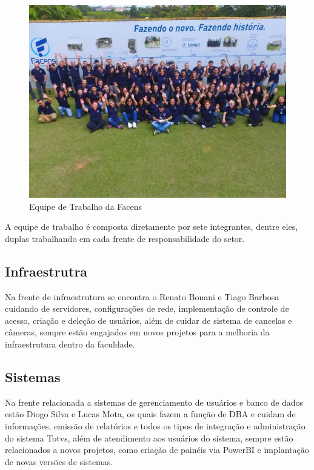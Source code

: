 \documentclass[
	12pt,				%
	oneside,			%
	a4paper,			%
	chapter=TITLE,		%
	section=TITLE,		%
	sumario=tradicional %
	english,			%
	french,				%
	spanish,			%
	brazil				%
	]{abntex2}
\begin{document}
\begin{figure}[htb]
	\caption{\label{fig:equipefacens} Equipe de Trabalho da Facens}
	\begin{center}
		\includegraphics[scale=0.6]{equipefacens}
	\end{center}
\end{figure}

\label{sec:equipetrabalho}
A equipe de trabalho é composta diretamente por sete integrantes, dentre eles, duplas trabalhando em cada frente de responsabilidade do setor.

\subsection{Infraestrutra}
Na frente de infraestrutura se encontra o Renato Bonani e Tiago Barbosa cuidando de servidores, configurações de rede, implementação de controle de acesso, criação e deleção de usuários, além de cuidar de sistema de cancelas e câmeras, sempre estão engajados em novos projetos para a melhoria da infraestrutura dentro da faculdade.

\subsection{Sistemas}
Na frente relacionada a sistemas de gerenciamento de usuários e banco de dados estão Diogo Silva e Lucas Mota, os quais fazem a função de DBA  e cuidam de informações, emissão de relatórios e todos os tipos de integração e administração do sistema Totvs, além de atendimento aos usuários do sistema, sempre estão relacionados a novos projetos, como criação de painéis via PowerBI e implantação de novas versões de sistemas.
\end{document}
